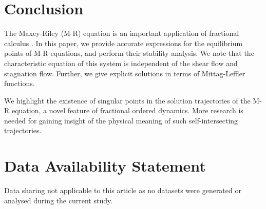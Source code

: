 \documentclass[pdflatex,sn-mathphys]{sn-jnl}%
\theoremstyle{thmstyleone}%
\theoremstyle{thmstyletwo}%
\theoremstyle{thmstylethree}%
\begin{document}
\section{Conclusion}\label{conclusion}
The Maxey-Riley (M-R) equation is an important application of fractional calculus \cite{kobayashi2005stability}. In this paper, we provide accurate expressions for the equilibrium points of M-R equations, and perform their stability analysis. We note that the characteristic equation of this system is independent of the shear flow and stagnation flow. Further, we give explicit solutions in terms of Mittag-Leffler functions.

We highlight the existence of singular points in the solution trajectories of the M-R equation, a novel feature of fractional ordered dynamics. More research is needed for gaining insight of the physical meaning of such self-intersecting trajectories.

\section*{Data Availability Statement}
Data sharing not applicable to this article as no datasets were generated or analysed during the current study.

\backmatter


\end{document}
